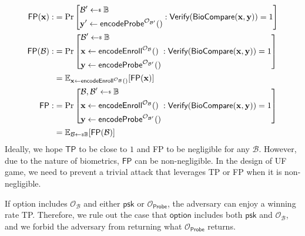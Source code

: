\begin{align*}
	\textsf{FP}(\mathbf{x}) 
	:&= \Pr \left[ 
		\begin{aligned}
			& \mathcal{B}^\prime \getsdollar \mathbb{B} \\
			& \mathbf{y}^\prime \gets \textsf{encodeProbe}^{\mathcal{O}_{\mathcal{B}^\prime}}()
		\end{aligned}
		: \textsf{Verify}(\textsf{BioCompare}(\mathbf{x}, \mathbf{y})) = 1 \right] \\
	\textsf{FP}(\mathcal{B}) 
	:&= \Pr \left[ 
		\begin{aligned}
			& \mathcal{B}^\prime \getsdollar \mathbb{B} \\
			& \mathbf{x} \gets \textsf{encodeEnroll}^{\mathcal{O}_\mathcal{B} }() \\
			& \mathbf{y} \gets \textsf{encodeProbe}^{\mathcal{O}_{\mathcal{B}^\prime} }()
		\end{aligned}
		: \textsf{Verify}(\textsf{BioCompare}(\mathbf{x}, \mathbf{y})) = 1 \right] \\
	&= \mathbb{E}_{ \mathbf{x} \gets \textsf{encodeEnroll}^{\mathcal{O}_\mathcal{B}}() }[\textsf{FP}(\mathbf{x})] \\
	\textsf{FP} 
	:&= \Pr \left[
		\begin{aligned}
			& \mathcal{B}, \mathcal{B}^\prime \getsdollar \mathbb{B} \\
			& \mathbf{x} \gets \textsf{encodeEnroll}^{\mathcal{O}_\mathcal{B} }() \\
			& \mathbf{y} \gets \textsf{encodeProbe}^{\mathcal{O}_{\mathcal{B}^\prime} }()
		\end{aligned}
		: \textsf{Verify}(\textsf{BioCompare}(\mathbf{x}, \mathbf{y})) = 1 \right] \\
	&= \mathbb{E}_{\mathcal{B} \getsdollar \mathbb{B}}[\textsf{FP}(\mathcal{B})]
\end{align*}
Ideally, we hope $\textsf{TP}$ to be close to $1$ and \textsf{FP} to be negligible for any $\mathcal{B}$. However, due to the nature of biometrics, $\textsf{FP}$ can be non-negligible. In the design of \textsf{UF} game, we need to prevent a trivial attack that leverages \textsf{TP} or \textsf{FP} when it is non-negligible.

If \textsf{option} includes $\mathcal{O}_\mathcal{B}$ and either $\textsf{psk}$ or $\mathcal{O}_\textsf{Probe}$, the adversary can enjoy a winning rate \textsf{TP}. Therefore, we rule out the case that $\textsf{option}$ includes both $\textsf{psk}$ and $\mathcal{O}_\mathcal{B}$, and we forbid the adversary from returning what $\mathcal{O}_\textsf{Probe}$ returns.

